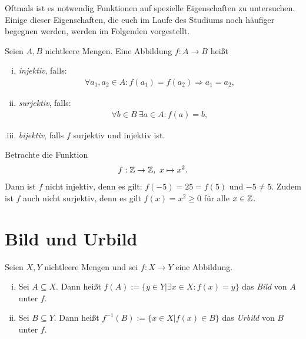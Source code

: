 Oftmals ist es notwendig Funktionen auf spezielle Eigenschaften zu untersuchen. Einige dieser Eigenschaften,
die euch im Laufe des Studiums noch häufiger begegnen werden, werden im Folgenden vorgestellt. %

\begin{mydef}
    Seien $A,B$ nichtleere Mengen. Eine Abbildung $f:A \to B$ heißt
    \begin{enumerate}[(i)]
        \item
        \textit{injektiv}, falls: 
        \begin{align*}
            \forall a_1,a_2 \in A: f(a_1)=f(a_2) \Rightarrow a_1 = a_2, 
        \end{align*}
        \item 
        \textit{surjektiv}, falls: 
        \begin{align*}
            \forall b \in B \ \exists a \in A: f(a) = b,
        \end{align*}
        \item 
        \textit{bijektiv}, falls $f$ surjektiv und injektiv ist. 
    \end{enumerate}
\end{mydef}

\begin{example}
    Betrachte die Funktion 
    \begin{align*}
        f: \mathbb{Z} \to \mathbb{Z}, \ x \mapsto x^2.
    \end{align*}
    Dann ist $f$ nicht injektiv, denn es gilt: $f(-5) = 25 = f(5)$ und $-5 \neq 5$. Zudem ist $f$ auch nicht surjektiv, denn es gilt $f(x) = x^2 \geq 0$ für alle $x \in \mathbb{Z}$. 
\end{example}

\section{Bild und Urbild} 

\begin{mydef}
    Seien $X,Y$ nichtleere Mengen und sei $f:X \to Y$ eine Abbildung. 
    \begin{enumerate}[(i)]
        \item 
        Sei $A \subseteq X$. Dann heißt $f(A):=\{y \in Y | \exists x \in X : f(x) = y \}$ das \textit{Bild} von $A$ unter $f$. 
        \item 
        Sei $B \subseteq Y$. Dann heißt $f^{-1}(B):=\{x \in X | f(x) \in B \}$ das \textit{Urbild} von $B$ unter $f$. 
    \end{enumerate}
\end{mydef}

